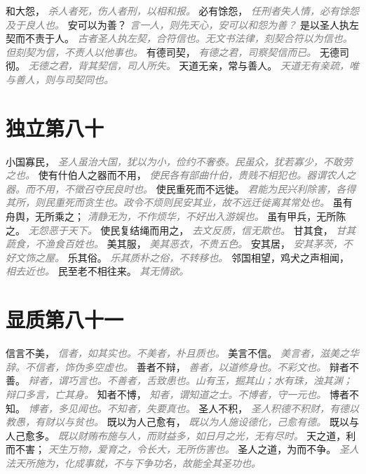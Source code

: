 \documentclass[a4paper,zihao=-4,oneside,landscape,UTF8]{ctexart}
\newcommand{\zhushi}[1]{\scriptsize{\textit{\textcolor{gray}{#1}}}\normalsize}
\begin{document}
和大怨，
\zhushi{杀人者死，伤人者刑，以相和报。}
必有馀怨，
\zhushi{任刑者失人情，必有馀怨及于良人也。}
安可以为善？
\zhushi{言一人，则先天心，安可以和怨为善？}
是以圣人执左契而不责于人。
\zhushi{古者圣人执左契，合符信也。无文书法律，刻契合符以为信也。但刻契为信，不责人以他事也。}
有德司契，
\zhushi{有德之君，司察契信而已。}
无德司彻。
\zhushi{无德之君，背其契信，司人所失。}
天道无亲，常与善人。
\zhushi{天道无有亲疏，唯与善人，则与司契同也。}


\section{独立第八十}

小国寡民，
\zhushi{圣人虽治大国，犹以为小，俭约不奢泰。民虽众，犹若寡少，不敢劳之也。}
使有什伯人之器而不用，
\zhushi{使民各有部曲什伯，贵贱不相犯也。器谓农人之器。而不用，不徵召夺民良时也。}
使民重死而不远徙。
\zhushi{君能为民兴利除害，各得其所，则民重死而贪生也。政令不烦则民安其业，故不远迁徙离其常处也。}
虽有舟舆，无所乘之；
\zhushi{清静无为，不作烦华，不好出入游娱也。}
虽有甲兵，无所陈之。
\zhushi{无怨恶于天下。}
使民复结绳而用之，
\zhushi{去文反质，信无欺也。}
甘其食，
\zhushi{甘其蔬食，不渔食百姓也。}
美其服，
\zhushi{美其恶衣，不贵五色。}
安其居，
\zhushi{安其茅茨，不好文饰之屋。}
乐其俗。
\zhushi{乐其质朴之俗，不转移也。}
邻国相望，鸡犬之声相闻，
\zhushi{相去近也。}
民至老不相往来。
\zhushi{其无情欲。}


\section{显质第八十一}

信言不美，
\zhushi{信者，如其实也。不美者，朴且质也。}
美言不信。
\zhushi{美言者，滋美之华辞。不信者，饰伪多空虚也。}
善者不辩，
\zhushi{善者，以道修身也。不彩文也。}
辩者不善。
\zhushi{辩者，谓巧言也。不善者，舌致患也。山有玉，掘其山；水有珠，浊其渊；辩口多言，亡其身。}
知者不博，
\zhushi{知者，谓知道之士。不博者，守一元也。}
博者不知。
\zhushi{博者，多见闻也。不知者，失要真也。}
圣人不积，
\zhushi{圣人积德不积财，有德以教愚，有财以与贫也。}
既以为人己愈有，
\zhushi{既以为人施设德化，己愈有德。}
既以与人己愈多。
\zhushi{既以财贿布施与人，而财益多，如日月之光，无有尽时。}
天之道，利而不害；
\zhushi{天生万物，爱育之，令长大，无所伤害也。}
圣人之道，为而不争。
\zhushi{圣人法天所施为，化成事就，不与下争功名，故能全其圣功也。}
\end{document}

